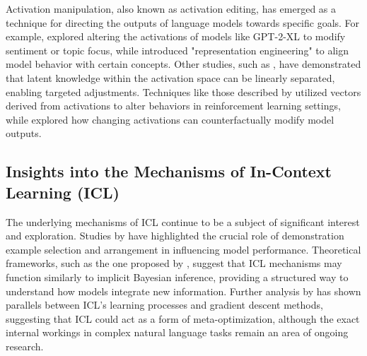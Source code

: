 Activation manipulation, also known as activation editing, has emerged as a technique for directing the outputs of language models towards specific goals. For example, \cite{Turner23} explored altering the activations of models like GPT-2-XL to modify sentiment or topic focus, while \cite{Zou23} introduced "representation engineering" to align model behavior with certain concepts. Other studies, such as \cite{Burns22}, have demonstrated that latent knowledge within the activation space can be linearly separated, enabling targeted adjustments. Techniques like those described by \cite{Mini23} utilized vectors derived from activations to alter behaviors in reinforcement learning settings, while \cite{Li22} explored how changing activations can counterfactually modify model outputs.

\subsection{Insights into the Mechanisms of In-Context Learning (ICL)}

The underlying mechanisms of ICL continue to be a subject of significant interest and exploration. Studies by \cite{Lu22, Shin22} have highlighted the crucial role of demonstration example selection and arrangement in influencing model performance. Theoretical frameworks, such as the one proposed by \cite{Xie21}, suggest that ICL mechanisms may function similarly to implicit Bayesian inference, providing a structured way to understand how models integrate new information. Further analysis by \cite{Wei23, Akyurek22} has shown parallels between ICL's learning processes and gradient descent methods, suggesting that ICL could act as a form of meta-optimization, although the exact internal workings in complex natural language tasks remain an area of ongoing research.